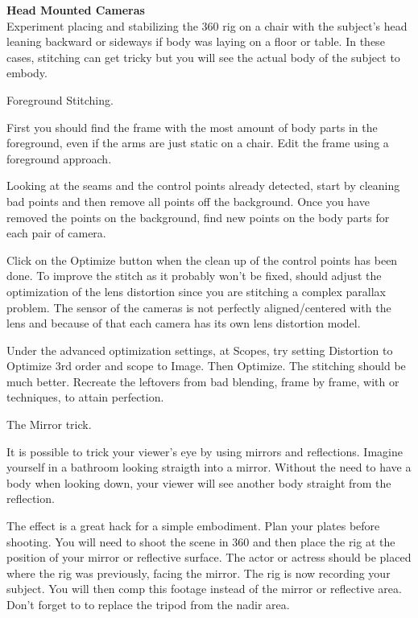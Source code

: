 \begin{fullwidth}
\clearpage
{\bfseries Head Mounted Cameras}
\\
Experiment placing and stabilizing the 360 rig on a chair with the subject’s head leaning backward or sideways if body was laying on a floor or table. In these cases, stitching can get tricky but you will see the actual body of the subject to embody.


\clearpage
{\large Foreground Stitching. \par}

First you should find the frame with the most amount of body parts in the foreground, even if the arms are just static on a chair. Edit the frame using a foreground approach.

Looking at the seams and the control points already detected, start by cleaning bad points and then remove all points off the background. Once you have removed the points on the background, find new points on the body parts for each pair of camera.

Click on the Optimize button when the clean up of the control points has been done. To improve the stitch as it probably won’t be fixed, should adjust the optimization of the lens distortion since you are stitching a complex parallax problem. The sensor of the cameras is not perfectly aligned/centered with the lens and because of that each camera has its own lens distortion model. 

Under the advanced optimization settings, at Scopes, try setting Distortion to Optimize 3rd order and scope to Image. Then Optimize. The stitching should be much better. Recreate the leftovers from bad blending, frame by frame, with \textbf{} or \textbf{} techniques, to attain perfection.

{\large The Mirror trick. \par}

It is possible to trick your viewer's eye by using mirrors and reflections. Imagine yourself in a bathroom looking straigth into a mirror. Without the need to have a body when looking down, your viewer will see another body straight from the reflection. 

The effect is a great hack for a simple embodiment. Plan your plates before shooting. You will need to shoot the scene in 360 and then place the rig at the position of your mirror or reflective surface. The actor or actress should be placed where the rig was previously, facing the mirror. The rig is now recording your subject. You will then comp this footage instead of the mirror or reflective area. Don't forget to \textbf{} to replace the tripod from the nadir area.


\clearpage
\end{fullwidth}